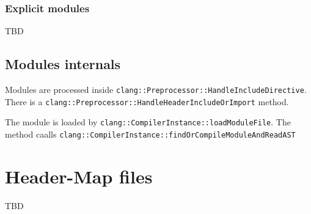 \subsubsection{Explicit modules}
TBD

\subsection{Modules internals}
Modules are processed inside
\texttt{clang::Preprocessor::HandleIncludeDirective}. There
is a \texttt{clang::Preprocessor::HandleHeaderIncludeOrImport} method. 

The module is loaded by
\texttt{clang::CompilerInstance::loadModuleFile}. The method caalls
 \texttt{clang::CompilerInstance::findOrCompileModuleAndReadAST}

% 

\section{Header-Map files}
TBD
